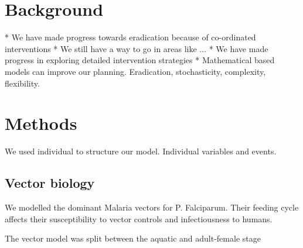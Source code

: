 \documentclass{bmcart}
\begin{document}


\section*{Background}
 * We have made progress towards eradication because of co-ordinated interventions
 * We still have a way to go in areas like ...
 * We have made progress in exploring detailed intervention strategies \cite{griffin_reducing_2010,griffin_estimates_2014,sherrard-smith_systematic_2018,okell_contrasting_2014}
 * Mathematical based models can improve our planning. Eradication, stochasticity, complexity, flexibility.

\section*{Methods}

We used individual to structure our model. Individual variables and events.

\subsection*{Vector biology}

We modelled the dominant Malaria vectors for P. Falciparum. Their feeding cycle affects their susceptibility to vector controls and infectiousness to humans.

The vector model was split between the aquatic and adult-female stage
\end{document}
